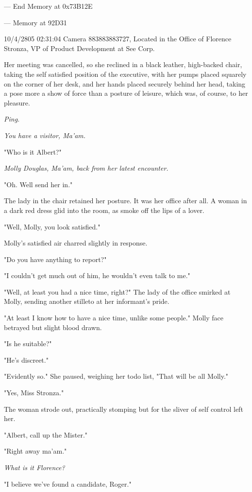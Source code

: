 \documentclass[12pt]{article}
\begin{document}
--- End Memory at 0x73B12E

--- Memory at 92D31

10/4/2805 02:31:04 Camera 883883883727, Located in the Office of Florence Stronza, VP of Product Development at See Corp.

Her meeting was cancelled, so she reclined in a black leather, high-backed chair, taking the self satisfied position of the executive, with her pumps placed squarely on the corner of her desk, and her hands placed securely behind her head, taking a pose more a show of force than a posture of leisure, which was, of course, to her pleasure.

\emph{Ping.}

\emph{You have a visitor, Ma'am.}

"Who is it Albert?"

\emph{Molly Douglas, Ma'am, back from her latest encounter.}

"Oh. Well send her in."

The lady in the chair retained her posture. It was her office after all. A woman in a dark red dress glid into the room, as smoke off the lips of a lover.

"Well, Molly, you look satisfied."

Molly's satisfied air charred slightly in response.

"Do you have anything to report?"

"I couldn't get much out of him, he wouldn't even talk to me."

"Well, at least you had a nice time, right?" The lady of the office smirked at Molly, sending another stilleto at her informant's pride.

"At least I know how to have a nice time, unlike some people." Molly face betrayed but slight blood drawn.

"Is he suitable?"

"He's discreet."

"Evidently so." She paused, weighing her todo list, "That will be all Molly."

"Yes, Miss Stronza."

The woman strode out, practically stomping but for the sliver of self control left her.

"Albert, call up the Mister."

"Right away ma'am."

\emph{What is it Florence?}

"I believe we've found a candidate, Roger."
\end{document}
